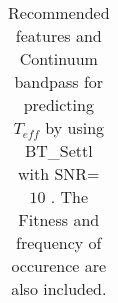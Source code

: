 {{{{\begin{table}
\begin{center}
\begin{tabular}{rrrrrrr}
   \hline
\end{tabular}
\caption {Recommended features and Continuum bandpass for predicting $ T_{eff} $ 
      by using BT\_Settl with SNR= $ 10 $ . 
      The Fitness and frequency of occurence are also included.} \label{tab:tab_SNR10_T} 
\end{center}
\end{table}


}}}}
